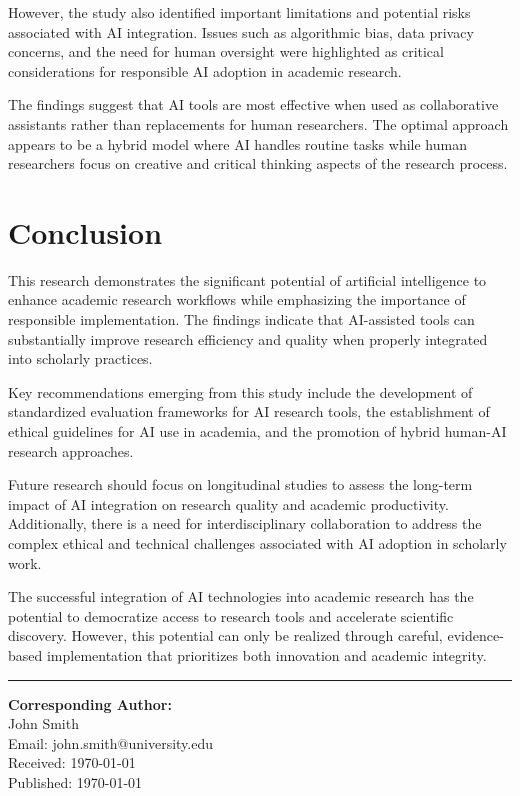 \documentclass[twocolumn]{article}
\begin{document}
However, the study also identified important limitations and potential risks associated with AI integration. Issues such as algorithmic bias, data privacy concerns, and the need for human oversight were highlighted as critical considerations for responsible AI adoption in academic research.

The findings suggest that AI tools are most effective when used as collaborative assistants rather than replacements for human researchers. The optimal approach appears to be a hybrid model where AI handles routine tasks while human researchers focus on creative and critical thinking aspects of the research process.

\section{Conclusion}

This research demonstrates the significant potential of artificial intelligence to enhance academic research workflows while emphasizing the importance of responsible implementation. The findings indicate that AI-assisted tools can substantially improve research efficiency and quality when properly integrated into scholarly practices.

Key recommendations emerging from this study include the development of standardized evaluation frameworks for AI research tools, the establishment of ethical guidelines for AI use in academia, and the promotion of hybrid human-AI research approaches.

Future research should focus on longitudinal studies to assess the long-term impact of AI integration on research quality and academic productivity. Additionally, there is a need for interdisciplinary collaboration to address the complex ethical and technical challenges associated with AI adoption in scholarly work.

The successful integration of AI technologies into academic research has the potential to democratize access to research tools and accelerate scientific discovery. However, this potential can only be realized through careful, evidence-based implementation that prioritizes both innovation and academic integrity.

\vspace{1cm}
\noindent\rule{\linewidth}{0.4pt}
\vspace{0.3cm}

{\small
\textbf{Corresponding Author:} \\
John Smith \\
Email: john.smith@university.edu \\
Received: \today \\
Published: \today
}
\end{document}
